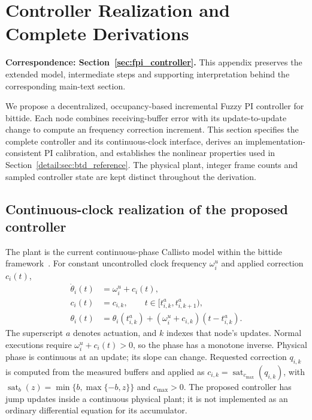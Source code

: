 \section{Controller Realization and Complete Derivations}
\label{app:controller}
\noindent\textbf{Correspondence: Section~\ref{sec:fpi_controller}.} This appendix preserves the extended model, intermediate steps and supporting interpretation behind the corresponding main-text section.


\label{detail:sec:fpi_controller}
We propose a decentralized, occupancy-based incremental Fuzzy PI controller
for bittide. Each node combines receiving-buffer error with its
update-to-update change to compute an frequency correction increment.
This section specifies the complete controller and its continuous-clock
interface, derives an implementation-consistent PI calibration, and
establishes the nonlinear properties used in
Section~\ref{detail:sec:btd_reference}. The physical plant, integer frame counts
and sampled controller state are kept distinct throughout the derivation.

\subsection{Continuous-clock realization of the proposed controller}

\label{detail:subsec:fpi_laws}
The plant is the current continuous-phase Callisto model within the bittide
framework~\cite{lall2024logicalSynchrony}. For constant
uncontrolled clock frequency $\omega_i^u$ and applied correction $c_i(t)$,
\begin{align}
 \dot\theta_i(t)&=\omega_i^u+c_i(t),\nonumber\\
 c_i(t)&=c_{i,k},\qquad t\in[t^a_{i,k},t^a_{i,k+1}),\nonumber\\
 \theta_i(t)&=\theta_i(t^a_{i,k})+
       (\omega_i^u+c_{i,k})(t-t^a_{i,k}).
 \label{detail:eq:fpi_continuous_plant}
\end{align}
The superscript $a$ denotes actuation, and $k$ indexes that node's updates.
Normal executions require $\omega_i^u+c_i(t)>0$, so the phase has a
monotone inverse. Physical phase is continuous at an update; its slope can change. Requested
correction $q_{i,k}$ is computed from the measured buffers and applied as
$c_{i,k}=\operatorname{sat}_{c_{\max}}(q_{i,k})$, with
$\operatorname{sat}_b(z)=\min\{b,\max\{-b,z\}\}$ and $c_{\max}>0$.
The proposed controller has jump updates inside a continuous physical plant;
it is not implemented as an ordinary differential equation for its accumulator.


